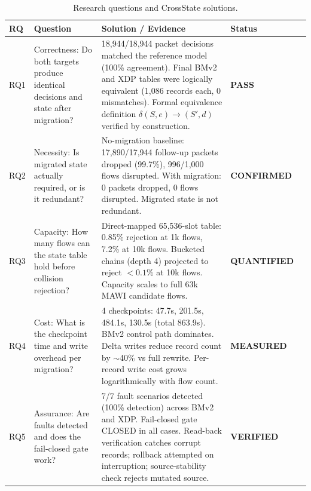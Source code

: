 \begin{table}[!t]
\centering
\footnotesize
\setlength{\tabcolsep}{4pt}
\renewcommand{\arraystretch}{1.2}
\caption{Research questions and CrossState solutions.}
\label{tab:rq}
\begin{tabular}{@{}llp{5.2cm}p{3.4cm}l@{}}
\toprule
\textbf{RQ} & \textbf{Question} & \textbf{Solution / Evidence} & \textbf{Status} \\
\midrule
RQ1 & Correctness: Do both targets produce identical decisions and state after migration? & 18,944/18,944 packet decisions matched the reference model (100\% agreement). Final BMv2 and XDP tables were logically equivalent (1,086 records each, 0 mismatches). Formal equivalence definition $\delta(S,e)\to(S',d)$ verified by construction. & \textbf{PASS} \\
RQ2 & Necessity: Is migrated state actually required, or is it redundant? & No-migration baseline: 17,890/17,944 follow-up packets dropped (99.7\%), 996/1,000 flows disrupted. With migration: 0 packets dropped, 0 flows disrupted. Migrated state is not redundant. & \textbf{CONFIRMED} \\
RQ3 & Capacity: How many flows can the state table hold before collision rejection? & Direct-mapped 65,536-slot table: 0.85\% rejection at 1k flows, 7.2\% at 10k flows. Bucketed chains (depth 4) projected to reject $<0.1\%$ at 10k flows. Capacity scales to full 63k MAWI candidate flows. & \textbf{QUANTIFIED} \\
RQ4 & Cost: What is the checkpoint time and write overhead per migration? & 4 checkpoints: 47.7s, 201.5s, 484.1s, 130.5s (total 863.9s). BMv2 control path dominates. Delta writes reduce record count by $\sim$40\% vs full rewrite. Per-record write cost grows logarithmically with flow count. & \textbf{MEASURED} \\
RQ5 & Assurance: Are faults detected and does the fail-closed gate work? & 7/7 fault scenarios detected (100\% detection) across BMv2 and XDP. Fail-closed gate CLOSED in all cases. Read-back verification catches corrupt records; rollback attempted on interruption; source-stability check rejects mutated source. & \textbf{VERIFIED} \\
\bottomrule
\end{tabular}
\end{table}